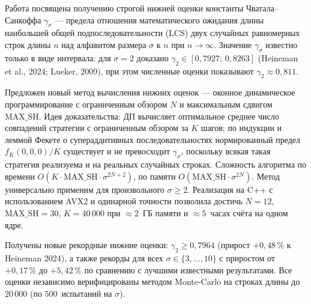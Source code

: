 Работа посвящена получению строгой нижней оценки константы Чватала--Санкоффа $\gamma_\sigma$ --- предела отношения математического ожидания длины наибольшей общей подпоследовательности (LCS) двух случайных равномерных строк длины $n$ над алфавитом размера $\sigma$ к $n$ при $n \to \infty$. Значение $\gamma_\sigma$ известно только в виде интервала: для $\sigma = 2$ доказано $\gamma_2 \in [0{,}7927;\, 0{,}8263]$ (Heineman et al., 2024; Lueker, 2009), при этом численные оценки показывают $\gamma_2 \approx 0{,}811$.

Предложен новый метод вычисления нижних оценок --- оконное динамическое программирование с ограниченным обзором $N$ и максимальным сдвигом $\mathrm{MAX\_SH}$. Идея доказательства: ДП вычисляет оптимальное среднее число совпадений стратегии с ограниченным обзором за $K$ шагов; по индукции и леммой Фекете о супераддитивных последовательностях нормированный предел $f_K(0,0,0)/K$ существует и не превосходит $\gamma_\sigma$, поскольку всякая такая стратегия реализуема и на реальных случайных строках. Сложность алгоритма по времени $O(K \cdot \mathrm{MAX\_SH} \cdot \sigma^{2N+2})$, по памяти $O(\mathrm{MAX\_SH} \cdot \sigma^{2N})$. Метод универсально применим для произвольного $\sigma \geq 2$. Реализация на C++ с использованием AVX2 и одинарной точности позволила достичь $N = 12$, $\mathrm{MAX\_SH} = 30$, $K = 40\,000$ при $\approx 2$~ГБ памяти и $\approx 5$~часах счёта на одном ядре.

Получены новые рекордные нижние оценки: $\gamma_2 \geq 0{,}7964$ (прирост $+0{,}48\,\%$ к Heineman 2024), а также рекорды для всех $\sigma \in \{3, \ldots, 10\}$ с приростом от $+0{,}17\,\%$ до $+5{,}42\,\%$ по сравнению с лучшими известными результатами. Все оценки независимо верифицированы методом Monte-Carlo на строках длины до $20\,000$ (по $500$~испытаний на $\sigma$).
